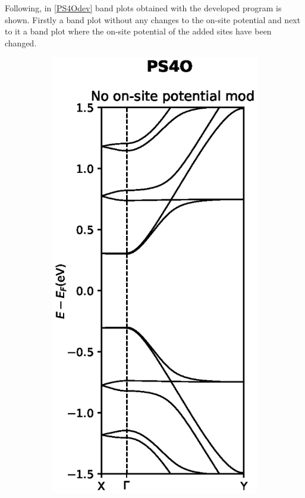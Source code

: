 Following, in \cref{PS4Odev} band plots obtained with the developed program is shown. Firstly a band plot without any changes to the on-site potential and next to it a band plot where the on-site potential of the added sites have been changed.
\begin{figure}[h]
    \centering
    \begin{subfigure}[b]{0.25\textwidth}
    \centering
    \includegraphics[width=\textwidth]{Figures/PS4Onomod.eps}

\end{subfigure}
\end{figure}
